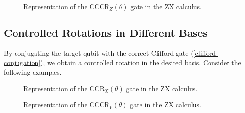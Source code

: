 \begin{figure}[H]
    \centering
    \caption{Representation of the CCCR$_Z(\theta)$ gate in the ZX calculus.}
    \label{cccrz}
\end{figure}

\subsection{Controlled Rotations in Different Bases}

By conjugating the target qubit with the correct Clifford gate (\ref{clifford-conjugation}), we obtain a controlled rotation in the desired basis. Consider the following examples.

\begin{figure}[H]
    \centering
    \caption{Representation of the CCR$_X(\theta)$ gate in the ZX calculus.}
\end{figure}

\begin{figure}[H]
    \centering
    \caption{Representation of the CCCR$_Y(\theta)$ gate in the ZX calculus.}
    \label{cccry}
\end{figure}
